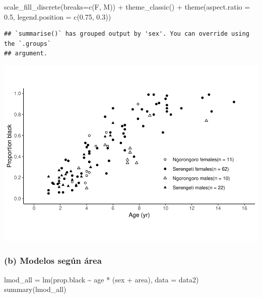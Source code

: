 \documentclass[
]{article}
\newenvironment{Shaded}{\begin{snugshade}}{\end{snugshade}}
\newcommand{\AttributeTok}[1]{\textcolor[rgb]{0.77,0.63,0.00}{#1}}
\newcommand{\FloatTok}[1]{\textcolor[rgb]{0.00,0.00,0.81}{#1}}
\newcommand{\FunctionTok}[1]{\textcolor[rgb]{0.00,0.00,0.00}{#1}}
\newcommand{\NormalTok}[1]{#1}
\newcommand{\OtherTok}[1]{\textcolor[rgb]{0.56,0.35,0.01}{#1}}
\newcommand{\SpecialCharTok}[1]{\textcolor[rgb]{0.00,0.00,0.00}{#1}}
\newcommand{\StringTok}[1]{\textcolor[rgb]{0.31,0.60,0.02}{#1}}
\begin{document}
\begin{Shaded}
\begin{Highlighting}[]
  \FunctionTok{scale\_fill\_discrete}\NormalTok{(}\AttributeTok{breaks=}\FunctionTok{c}\NormalTok{(}\StringTok{\textquotesingle{}F\textquotesingle{}}\NormalTok{, }\StringTok{\textquotesingle{}M\textquotesingle{}}\NormalTok{)) }\SpecialCharTok{+}
  \FunctionTok{theme\_classic}\NormalTok{() }\SpecialCharTok{+}
  \FunctionTok{theme}\NormalTok{(}\AttributeTok{aspect.ratio =} \FloatTok{0.5}\NormalTok{, }\AttributeTok{legend.position =} \FunctionTok{c}\NormalTok{(}\FloatTok{0.75}\NormalTok{, }\FloatTok{0.3}\NormalTok{))}
\end{Highlighting}
\end{Shaded}

\begin{verbatim}
## `summarise()` has grouped output by 'sex'. You can override using the `.groups`
## argument.
\end{verbatim}

\includegraphics{code_files/figure-latex/unnamed-chunk-11-1.pdf}

\hypertarget{b-modelos-seguxfan-uxe1rea}{%
\subsubsection{(b) Modelos según
área}\label{b-modelos-seguxfan-uxe1rea}}

\begin{Shaded}
\begin{Highlighting}[]
\NormalTok{lmod\_all }\OtherTok{=} \FunctionTok{lm}\NormalTok{(prop.black }\SpecialCharTok{\textasciitilde{}}\NormalTok{ age }\SpecialCharTok{*}\NormalTok{ (sex }\SpecialCharTok{+}\NormalTok{ area), }\AttributeTok{data =}\NormalTok{ data2)}
\FunctionTok{summary}\NormalTok{(lmod\_all)}
\end{Highlighting}
\end{Shaded}
\end{document}

